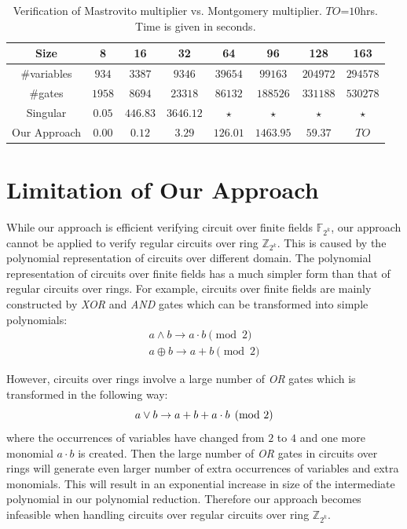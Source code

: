 \begin{table}[h!]
\begin{center}
\caption{Verification of Mastrovito multiplier vs. Montgomery multiplier. $TO$=$10$hrs. Time is given in seconds.}
\label{tab:masvsmont}
\begin{tabular}{|c||c|c|c|c|c|c|c|} \hline 
Size   			&8  		&16       	&32       	&64       	&96      	&128		&163	\\
\hline 
\#variables 	&$934$ 		&$3387$ 	&$9346$ 	&$39654$ 	&$99163$ 	&$204972$ 	&$294578$ 	\\
\hline 
\#gates 		&$1958$  	&$8694$    	&$23318$   	&$86132$   	&$188526$ 	&$331188$ 	&$530278$ \\
\hline
Singular		&$0.05$  	&$446.83$   &$3646.12$  &$\star$   	&$\star$ 	&$\star$ 	&$\star$	\\
\hline
Our Approach	&$0.00$  	&$0.12$   	&$3.29$  	&$126.01$  &$1463.95$  &$59.37$		&$TO$ \\
\hline
\end{tabular}
\end{center}
\vspace{-0.2in}
\end{table}

\section{Limitation of Our Approach}
While our approach is efficient verifying circuit over finite fields $\mathbb{F}_{2^{k}}$, our approach cannot be applied to verify regular 
circuits over ring $\mathbb{Z}_{2^{k}}$. This is caused by the polynomial representation of circuits over different domain. 
The polynomial representation of circuits over finite fields has a much simpler form than that of regular circuits over rings.
For example, circuits over finite fields are mainly constructed by {\it XOR} and {\it AND} gates which can be transformed into simple polynomials:
\begin{eqnarray}
a \wedge b \rightarrow a\cdot b \pmod 2  \nonumber \\ 
a \oplus b \rightarrow a+b \pmod 2  \nonumber 
\end{eqnarray}

However, circuits over rings involve a large number of {\it OR} gates which is transformed in the following way:
\begin{equation}
a \vee b \rightarrow a+b+a\cdot b \pmod 2  \nonumber \\ 
\end{equation}
where the occurrences of variables have changed from $2$ to $4$ and one more monomial $a\cdot b$ is created.
Then the large number of {\it OR} gates in circuits over rings will generate even larger number of 
extra occurrences of variables and extra monomials.
This will result in an exponential increase in size of the intermediate polynomial in our polynomial reduction.
Therefore our approach becomes infeasible when handling circuits over regular circuits over ring $\mathbb{Z}_{2^{k}}$.

